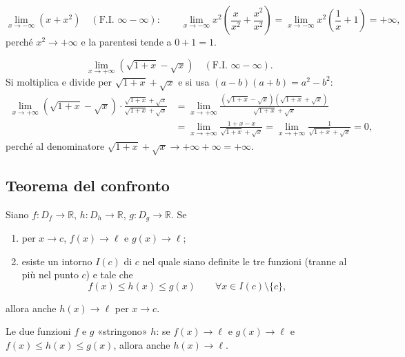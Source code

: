 \documentclass[11pt,a4paper]{article}
\begin{document}
\begin{esempio}[Raccoglimento]
\[
\lim_{x\to-\infty}\left(x + x^2\right) \quad (\text{F.I. } \infty - \infty): \qquad
\lim_{x\to-\infty} x^2\left(\frac{x}{x^2} + \frac{x^2}{x^2}\right) = \lim_{x\to-\infty} x^2\left(\frac{1}{x} + 1\right) = +\infty ,
\]
perché $x^2 \to +\infty$ e la parentesi tende a $0 + 1 = 1$.
\end{esempio}

\begin{esempio}[Razionalizzazione]
\[
\lim_{x\to+\infty}\left(\sqrt{1 + x} - \sqrt{x}\right) \quad (\text{F.I. } \infty - \infty).
\]
Si moltiplica e divide per $\sqrt{1 + x} + \sqrt{x}$ e si usa $(a - b)(a + b) = a^2 - b^2$:
\begin{align*}
  \lim_{x\to+\infty}\left(\sqrt{1+x} - \sqrt{x}\right)\cdot\frac{\sqrt{1+x} + \sqrt{x}}{\sqrt{1+x} + \sqrt{x}}
  &= \lim_{x\to+\infty}\frac{\left(\sqrt{1+x} - \sqrt{x}\right)\left(\sqrt{1+x} + \sqrt{x}\right)}{\sqrt{1+x} + \sqrt{x}}\\
  &= \lim_{x\to+\infty}\frac{1 + x - x}{\sqrt{1+x} + \sqrt{x}}
   = \lim_{x\to+\infty}\frac{1}{\sqrt{1+x} + \sqrt{x}} = 0,
\end{align*}
perché al denominatore $\sqrt{1+x} + \sqrt{x} \to +\infty + \infty = +\infty$.
\end{esempio}

\subsection{Teorema del confronto}

\begin{teorema}
Siano $f : D_f \to \mathbb{R}$, $h : D_h \to \mathbb{R}$, $g : D_g \to \mathbb{R}$. Se
\begin{enumerate}
  \item per $x \to c$, $f(x) \to \ell$ e $g(x) \to \ell$;
  \item esiste un intorno $I(c)$ di $c$ nel quale siano definite le tre funzioni (tranne al più nel punto $c$) e tale che
  \[
    f(x) \le h(x) \le g(x) \qquad \forall x \in I(c)\setminus\{c\},
  \]
\end{enumerate}
allora anche $h(x) \to \ell$ per $x \to c$.
\end{teorema}

Le due funzioni $f$ e $g$ «stringono» $h$: se $f(x) \to \ell$ e $g(x) \to \ell$ e $f(x) \le h(x) \le g(x)$, allora anche $h(x) \to \ell$.
\end{document}
